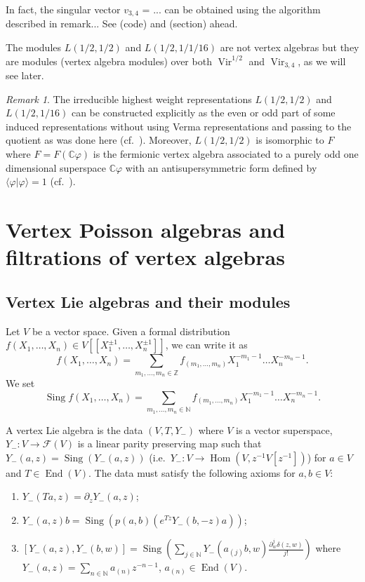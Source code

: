 \documentclass[a4paper, 12pt, reqno]{amsart}
\theoremstyle{remark}
\newtheorem{remark}[theorem]{Remark}
\numberwithin{equation}{subsection}
\DeclareMathOperator{\Vir}{Vir}
\DeclareMathOperator{\End}{End}
\DeclareMathOperator{\one}{\overline{1}}
\DeclareMathOperator{\Hom}{Hom}
\DeclareMathOperator{\Sing}{Sing}
\begin{document}
In fact, the singular vector $v_{3, 4}$ = ... can be obtained using the algorithm described in remark... See (code) and (section) ahead.

The modules $L(1/2, 1/2)$ and $L(1/2, 1/1/16)$ are not vertex algebras but they are modules (vertex algebra modules) over both $\Vir^{1/2}$ and $\Vir_{3, 4}$, as we will see later.

\begin{remark}
  \label{rmk:25}
  The irreducible highest weight representations $L(1/2, 1/2)$ and $L(1/2, 1/16)$ can be constructed explicitly as the even or odd part of some induced representations without using Verma representations and passing to the quotient as was done here (cf.\ \cite[\S3]{kac_bombay_2013}).
  Moreover, $L(1/2, 1/2)$ is isomorphic to $F_{\one}$ where $F = F(\mathbb{C}\varphi)$ is the fermionic vertex algebra associated to a purely odd one dimensional superspace $\mathbb{C}\varphi$ with an antisupersymmetric form defined by $\langle \varphi| \varphi\rangle = 1$ (cf.\ ).
\end{remark}

\section{Vertex Poisson algebras and filtrations of vertex algebras}
\label{sec:vert-poiss-algebr}

\subsection{Vertex Lie algebras and their modules}
\label{sec:vert-lie-algebr}

Let $V$ be a vector space.
Given a formal distribution $f(X_1, \dots, X_n) \in V[[X_1^{\pm 1}, \dots, X_n^{\pm 1}]]$, we can write it as
\begin{equation*}
  f(X_1, \dots, X_n) = \sum_{m_1, \dots, m_n \in \mathbb{Z}}f_{(m_1, \dots, m_n)}X_1^{-m_1 - 1}\dots X_n^{-m_n - 1}.
\end{equation*}
We set
\begin{equation*}
  \Sing f(X_1, \dots, X_n) = \sum_{m_1, \dots, m_n \in \mathbb{N}}f_{(m_1, \dots, m_n)}X_1^{-m_1 - 1}\dots X_n^{-m_n - 1}.
\end{equation*}

A vertex Lie algebra is the data $(V, T, Y_-)$ where $V$ is a vector superspace, $Y_-: V \to \mathcal{F}(V)$ is a linear parity preserving map such that $Y_-(a,z) = \Sing(Y_-(a, z))$ (i.e.\ $Y_-: V \to \Hom(V, z^{-1}V[z^{-1}])$) for $a\in V$ and $T \in \End(V)$.
The data must satisfy the following axioms for $a, b \in V$:
\begin{enumerate}
\item $Y_-(Ta, z) = \partial_zY_-(a, z)$;
\item $Y_-(a, z)b = \Sing(p(a, b)(e^{Tz}Y_-(b, -z)a))$;
\item $[Y_-(a, z),Y_-(b, w)] = \Sing(\sum_{j \in \mathbb{N}}Y_-(a_{(j)}b, w)\frac{\partial^j_w\delta(z, w)}{j!})$ where $Y_-(a, z) = \sum_{n \in \mathbb{N}}a_{(n)}z^{-n - 1}$, $a_{(n)} \in \End(V)$.
\end{enumerate}
\end{document}
